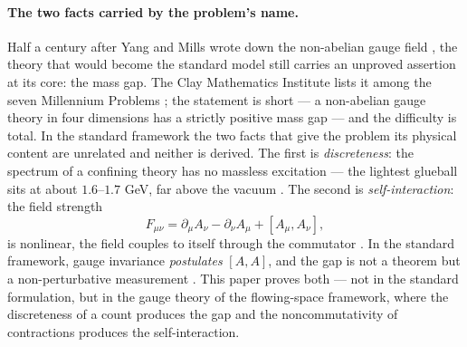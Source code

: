 \documentclass[aps,prd,preprint,superscriptaddress,amsmath,amssymb]{revtex4-2}
\begin{document}
\paragraph{The two facts carried by the problem's name.}
Half a century after Yang and Mills wrote down the non-abelian gauge
field \cite{yang1954conservation}, the theory that would become the
standard model still carries an unproved assertion at its core: the
mass gap.  The Clay Mathematics Institute lists it among the seven
Millennium Problems \cite{jaffe2000yang}; the statement is short ---
a non-abelian gauge theory in four dimensions has a strictly positive
mass gap --- and the difficulty is total.  In the standard framework
the two facts that give the problem its physical content are
unrelated and neither is derived.  The first is \emph{discreteness}:
the spectrum of a confining theory has no massless excitation --- the
lightest glueball sits at about $1.6$--$1.7$ GeV, far above the vacuum
\cite{morningstar1999glueball,chen2006glueball}.
The second is \emph{self-interaction}: the field strength
\begin{equation}
F_{\mu\nu}=\partial_\mu A_\nu-\partial_\nu A_\mu+[A_\mu,A_\nu],
\label{eq:ymfield}
\end{equation}
is nonlinear, the field couples to itself through the commutator
\cite{yang1954conservation}.  In the standard framework, gauge
invariance \emph{postulates} $[A,A]$, and the gap is not a theorem
but a non-perturbative measurement
\cite{jaffe2000yang,weinberg1995quantum}.  This paper proves both ---
not in the standard formulation, but in the gauge theory of the
flowing-space framework, where the discreteness of a count produces
the gap and the noncommutativity of contractions produces the
self-interaction.
\end{document}
